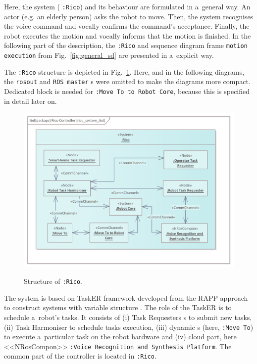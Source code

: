 \documentclass[11pt,oneside,a4paper]{report}
\begin{document}
	Here, the system (\stSystem{} \texttt{:Rico}) and its behaviour are formulated in a~general way. An actor (e.g. an elderly person) asks the robot to move. Then, the system recognises the voice command and vocally confirms the command's acceptance. Finally, the robot executes the motion and vocally informs that the motion is finished.
	In the following part of the description, the \stSystem{} \texttt{:Rico} and sequence diagram frame \texttt{motion execution} from Fig.~\ref{fig:general_sd} are presented in a~explicit way.
	
		The \stSystem{} \texttt{:Rico} structure is depicted in Fig.~\ref{fig:rico_system_ibd}. Here, and in the following diagrams, the \texttt{rosout} and \texttt{ROS master} \stNode{}s were omitted to make the diagrams more compact. Dedicated block is needed for \stCommChannel{} \texttt{:Move To to Robot Core}, because this \stCommChannel{} is specified in detail later on.
	
	\begin{figure}[H]
		\centering
		\begin{center}
			{\includegraphics[scale=0.85]{img/rico_pkg/rico_system_ibd.png}}
		\end{center}
		\caption{Structure of \stSystem{}\texttt{:Rico}.} 
		\label{fig:rico_system_ibd}
	\end{figure}

	The system is based on TaskER framework \cite{tasker2020} developed from the RAPP approach to construct systems with variable structure \cite{zielinski2017variable}. The role of the TaskER is to schedule a~robot’s tasks. It consists of (i) Task Requesters \stNode{}s to submit new tasks, (ii) Task Harmoniser \stNode{} to schedule tasks execution, (iii) dynamic \stNode{}s (here, \stNode{} \texttt{:Move To}) to execute a~particular task on the robot hardware and (iv) cloud part, here <<NRosCompon>> \texttt{:Voice Recognition and Synthesis Platform}. The common part of the controller is located in \stSystem{} \texttt{:Rico}.
	
\end{document}
